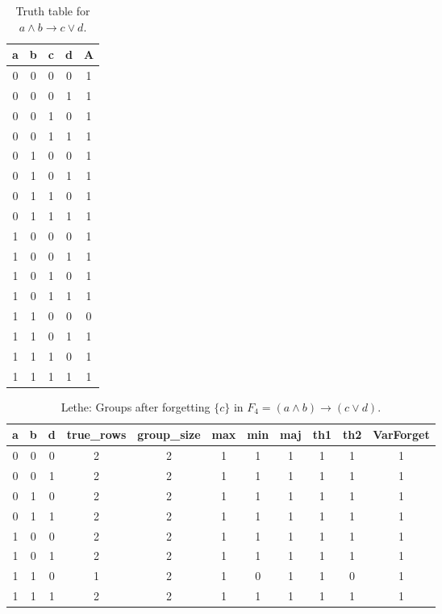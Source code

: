 \begin{table}[!tb]
    \centering
    \begin{tabular}{|c|c|c|c|c|}
        \hline
        \textbf{a} & \textbf{b} & \textbf{c} & \textbf{d} & \textbf{A} \\ \hline
        0 & 0 & 0 & 0 & 1 \\ \hline
        0 & 0 & 0 & 1 & 1 \\ \hline
        0 & 0 & 1 & 0 & 1 \\ \hline
        0 & 0 & 1 & 1 & 1 \\ \hline
        0 & 1 & 0 & 0 & 1 \\ \hline
        0 & 1 & 0 & 1 & 1 \\ \hline
        0 & 1 & 1 & 0 & 1 \\ \hline
        0 & 1 & 1 & 1 & 1 \\ \hline
        1 & 0 & 0 & 0 & 1 \\ \hline
        1 & 0 & 0 & 1 & 1 \\ \hline
        1 & 0 & 1 & 0 & 1 \\ \hline
        1 & 0 & 1 & 1 & 1 \\ \hline
        1 & 1 & 0 & 0 & 0 \\ \hline
        1 & 1 & 0 & 1 & 1 \\ \hline
        1 & 1 & 1 & 0 & 1 \\ \hline
        1 & 1 & 1 & 1 & 1 \\ \hline
    \end{tabular}
    \caption{Truth table for $a \land b \rightarrow c \lor d$.}
    \label{tab:truthtab}
\end{table}

\begin{table}[!tb]
    \centering
    \begin{tabular}{|c|c|c|c|c|c|c|c|c|c|c|}
        \hline
        \textbf{a} & \textbf{b} & \textbf{d} & \textbf{true\_rows} & \textbf{group\_size} & \textbf{max} & \textbf{min} & \textbf{maj} & \textbf{th1} & \textbf{th2} & \textbf{VarForget} \\ \hline
        \rowcolor{gray!40} 0 & 0 & 0 & 2 & 2 & 1 & 1 & 1 & 1 & 1 & 1 \\ \hline
        \rowcolor{blue!40} 0 & 0 & 1 & 2 & 2 & 1 & 1 & 1 & 1 & 1 & 1 \\ \hline
        \rowcolor{red!40} 0 & 1 & 0 & 2 & 2 & 1 & 1 & 1 & 1 & 1 & 1 \\ \hline
        \rowcolor{green!40} 0 & 1 & 1 & 2 & 2 & 1 & 1 & 1 & 1 & 1 & 1 \\ \hline
        \rowcolor{yellow!40} 1 & 0 & 0 & 2 & 2 & 1 & 1 & 1 & 1 & 1 & 1 \\ \hline
        \rowcolor{gray!40} 1 & 0 & 1 & 2 & 2 & 1 & 1 & 1 & 1 & 1 & 1 \\ \hline
        \rowcolor{blue!40} 1 & 1 & 0 & 1 & 2 & 1 & 0 & 1 & 1 & 0 & 1 \\ \hline
        \rowcolor{red!40} 1 & 1 & 1 & 2 & 2 & 1 & 1 & 1 & 1 & 1 & 1 \\ \hline
    \end{tabular}
    \caption{Lethe: Groups after forgetting $\{c\}$ in $F_{4} = (a \land b) \rightarrow (c \lor d)$.}
    \label{tab:lethe-F4-c-groups}
\end{table}
